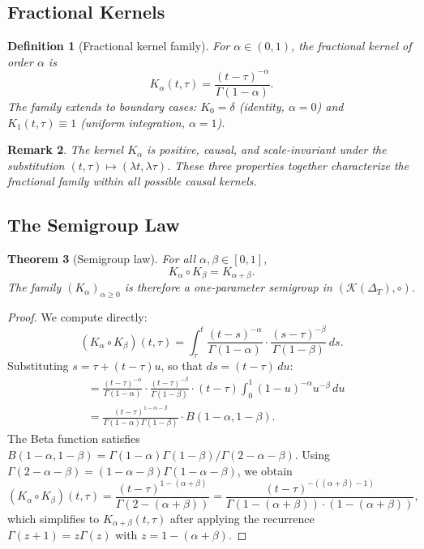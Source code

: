 \documentclass[12pt]{article}
\newtheorem{theorem}{Theorem}[section]
\newtheorem{definition}[theorem]{Definition}
\newtheorem{remark}[theorem]{Remark}
\newcommand{\Kcal}{\mathcal{K}}
\begin{document}
\subsection{Fractional Kernels}

\begin{definition}[Fractional kernel family]
\label{def:frac}
For $\alpha \in (0,1)$, the \emph{fractional kernel of order $\alpha$} is
\[
  K_\alpha(t,\tau) = \frac{(t-\tau)^{-\alpha}}{\Gamma(1-\alpha)}.
\]
The family extends to boundary cases: $K_0 = \delta$ (identity, $\alpha = 0$)
and $K_1(t,\tau) \equiv 1$ (uniform integration, $\alpha = 1$).
\end{definition}

\begin{remark}
The kernel $K_\alpha$ is positive, causal, and scale-invariant under the
substitution $(t,\tau) \mapsto (\lambda t, \lambda\tau)$. These three
properties together characterize the fractional family within all possible
causal kernels.
\end{remark}

\subsection{The Semigroup Law}

\begin{theorem}[Semigroup law]
\label{thm:semigroup}
For all $\alpha, \beta \in [0,1]$,
\[
  K_\alpha \circ K_\beta = K_{\alpha+\beta}.
\]
The family $(K_\alpha)_{\alpha \geq 0}$ is therefore a one-parameter semigroup
in $(\Kcal(\Delta_T), \circ)$.
\end{theorem}

\begin{proof}
We compute directly:
\[
  (K_\alpha \circ K_\beta)(t,\tau)
  = \int_\tau^t \frac{(t-s)^{-\alpha}}{\Gamma(1-\alpha)}\cdot
    \frac{(s-\tau)^{-\beta}}{\Gamma(1-\beta)}\, ds.
\]
Substituting $s = \tau + (t-\tau)u$, so that $ds = (t-\tau)\,du$:
\begin{align*}
  &= \frac{(t-\tau)^{-\alpha}}{\Gamma(1-\alpha)}\cdot
    \frac{(t-\tau)^{-\beta}}{\Gamma(1-\beta)}\cdot (t-\tau)
    \int_0^1 (1-u)^{-\alpha} u^{-\beta}\, du \\
  &= \frac{(t-\tau)^{1-\alpha-\beta}}{\Gamma(1-\alpha)\Gamma(1-\beta)}
    \cdot B(1-\alpha, 1-\beta).
\end{align*}
The Beta function satisfies $B(1-\alpha, 1-\beta) =
\Gamma(1-\alpha)\Gamma(1-\beta)/\Gamma(2-\alpha-\beta)$.
Using $\Gamma(2-\alpha-\beta) = (1-\alpha-\beta)\Gamma(1-\alpha-\beta)$, we obtain
\[
  (K_\alpha \circ K_\beta)(t,\tau)
  = \frac{(t-\tau)^{1-(\alpha+\beta)}}{\Gamma(2-(\alpha+\beta))}
  = \frac{(t-\tau)^{-((\alpha+\beta)-1)}}{\Gamma(1-(\alpha+\beta))\cdot(1-(\alpha+\beta))},
\]
which simplifies to $K_{\alpha+\beta}(t,\tau)$ after applying the recurrence
$\Gamma(z+1)=z\Gamma(z)$ with $z=1-(\alpha+\beta)$.
\end{proof}
\end{document}
